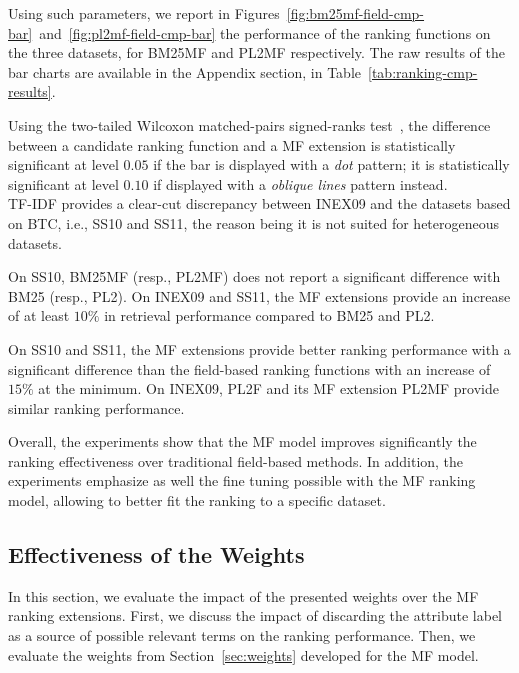 Using such parameters, we report in Figures~\ref{fig:bm25mf-field-cmp-bar}~and~\ref{fig:pl2mf-field-cmp-bar} the performance of the ranking functions on the three datasets, for BM25MF and PL2MF respectively. The raw results of the bar charts are available in the Appendix section, in Table~\ref{tab:ranking-cmp-results}.

Using the two-tailed Wilcoxon matched-pairs signed-ranks test~\cite{sheskin:2003:CRC,buttcher:2010:IRI:1869919}, the difference between a candidate ranking function and a MF extension is statistically significant at level $0.05$ if the bar is displayed with a \textit{dot} pattern; it is statistically significant at level $0.10$ if displayed with a \emph{oblique lines} pattern instead.\\

TF-IDF provides a clear-cut discrepancy between INEX09 and the datasets based on BTC, i.e., SS10 and SS11, the reason being it is not suited for heterogeneous datasets.

On SS10, BM25MF (resp., PL2MF) does not report a significant difference with BM25 (resp., PL2). On INEX09 and SS11, the MF extensions provide an increase of at least $10\%$ in retrieval performance compared to BM25 and PL2.

On SS10 and SS11, the MF extensions provide better ranking performance with a significant difference than the field-based ranking functions with an increase of $15\%$ at the minimum. On INEX09, PL2F and its MF extension PL2MF provide similar ranking performance.

Overall, the experiments show that the MF model improves significantly the ranking effectiveness over traditional field-based methods. In addition, the experiments emphasize as well the fine tuning possible with the MF ranking model, allowing to better fit the ranking to a specific dataset.



\subsection{Effectiveness of the Weights}
\label{sec:weights-effectiveness}

In this section, we evaluate the impact of the presented weights over the MF ranking extensions. First, we discuss the impact of discarding the attribute label as a source of possible relevant terms on the ranking performance. Then, we evaluate the weights from Section~\ref{sec:weights} developed for the MF model.

